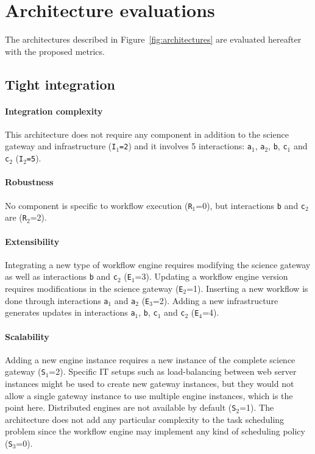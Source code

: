 \documentclass[preprint,3p,twocolumn]{elsarticle}
\newcommand{\correction}[1]{\color{blue}#1\color{black}\xspace}
\begin{document}
\section{\correction{Architecture evaluations}}

\label{sec:evaluation}

The architectures described in Figure~\ref{fig:architectures} are
evaluated \correction{hereafter with the proposed metrics}.

\subsection{Tight integration}

\paragraph{Integration complexity} This architecture does not require any
component in addition to the science gateway and infrastructure
(\texttt{I$_1$=2}) and it involves 5 interactions: \texttt{a$_1$},
\texttt{a$_2$}, \texttt{b}, \texttt{c$_1$} and \texttt{c$_2$}
(\texttt{I$_2$=5}).

\paragraph{Robustness} No component is specific to workflow execution
(\texttt{R$_1$}=0), but interactions \texttt{b} and \texttt{c$_2$} are
(\texttt{R$_2$}=2).

\paragraph{Extensibility} Integrating a new type of workflow engine
requires modifying the science gateway as well as interactions
\texttt{b} and \texttt{c$_2$} (\texttt{E$_1$}=3). Updating a workflow
engine version requires modifications in the science gateway
(\texttt{E$_2$}=1).  Inserting a new workflow is done through
interactions \texttt{a$_1$} and \texttt{a$_2$}
(\texttt{E$_3$}=2). Adding a new infrastructure generates updates in
interactions \texttt{a$_1$}, \texttt{b}, \texttt{c$_1$} and
\texttt{c$_2$} (\texttt{E$_4$}=4).

\paragraph{Scalability} Adding a new engine instance requires a new
instance of the complete science gateway
(\texttt{S$_1$}=2). 
Specific IT setups such as load-balancing between
web server instances might be used to create new gateway instances, but they would not allow a single gateway instance to use multiple engine instances, which is the point here.
Distributed engines are not available by default
(\texttt{S$_2$}=1). 
The architecture does not add any particular complexity to the task scheduling problem since the workflow engine
may implement any kind of scheduling policy (\texttt{S$_3$}=0).
\end{document}
